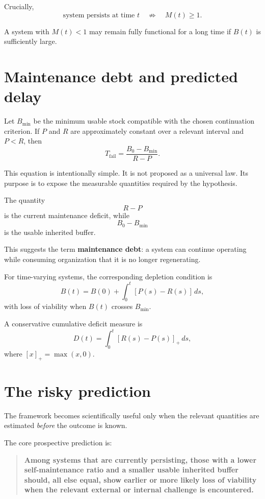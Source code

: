 \documentclass[11pt,a4paper]{article}
\begin{document}
Crucially,
\[
\text{system persists at time }t
\quad\not\Rightarrow\quad
M(t)\ge 1.
\]

A system with $M(t)<1$ may remain fully functional for a long time if $B(t)$ is sufficiently large.

\section{Maintenance debt and predicted delay}

Let $B_{\min}$ be the minimum usable stock compatible with the chosen continuation criterion. If $P$ and $R$ are approximately constant over a relevant interval and $P<R$, then
\begin{equation}
\boxed{
T_{\mathrm{fail}}
=
\frac{B_0-B_{\min}}{R-P}.
}
\label{eq:failure-time}
\end{equation}

This equation is intentionally simple. It is not proposed as a universal law. Its purpose is to expose the measurable quantities required by the hypothesis.

The quantity
\[
R-P
\]
is the current maintenance deficit, while
\[
B_0-B_{\min}
\]
is the usable inherited buffer.

This suggests the term \textbf{maintenance debt}: a system can continue operating while consuming organization that it is no longer regenerating.

For time-varying systems, the corresponding depletion condition is
\begin{equation}
B(t)
=
B(0)
+
\int_0^t \left[P(s)-R(s)\right]\,ds,
\label{eq:time-varying-buffer}
\end{equation}
with loss of viability when $B(t)$ crosses $B_{\min}$.

A conservative cumulative deficit measure is
\begin{equation}
D(t)
=
\int_0^t \left[R(s)-P(s)\right]_{+}\,ds,
\label{eq:deficit}
\end{equation}
where $[x]_+=\max(x,0)$.

\section{The risky prediction}

The framework becomes scientifically useful only when the relevant quantities are estimated \emph{before} the outcome is known.

The core prospective prediction is:

\begin{quote}
\textbf{Among systems that are currently persisting, those with a lower self-maintenance ratio and a smaller usable inherited buffer should, all else equal, show earlier or more likely loss of viability when the relevant external or internal challenge is encountered.}
\end{quote}
\end{document}
